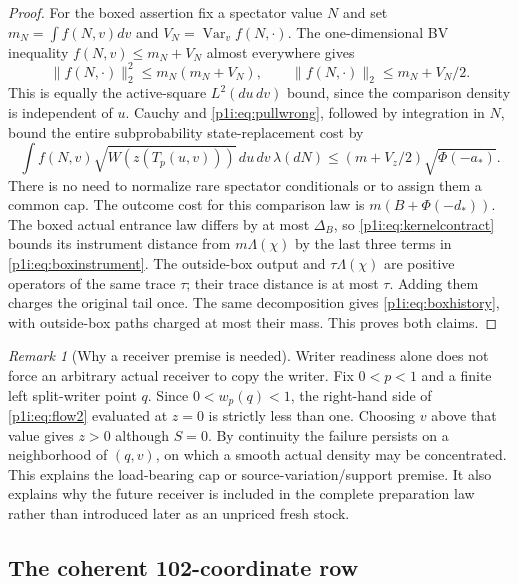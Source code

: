 \documentclass[11pt]{article}
\numberwithin{equation}{section}
\theoremstyle{definition}
\theoremstyle{remark}
\newtheorem{remark}[theorem]{Remark}
\begin{document}
\begin{proof}
For the boxed assertion fix a spectator value $N$ and set
$m_N=\int f(N,v)dv$ and $V_N=\operatorname{Var}_v f(N,\cdot)$.
The one-dimensional BV inequality $f(N,v)\leq m_N+V_N$ almost everywhere
gives
\[
 \|f(N,\cdot)\|_2^2\leq m_N(m_N+V_N),
 \qquad \|f(N,\cdot)\|_2\leq m_N+V_N/2.
\]
This is equally the active-square $L^2(du\,dv)$ bound, since the comparison
density is independent of $u$. Cauchy and \eqref{p1i:eq:pullwrong}, followed
by integration in $N$, bound the entire subprobability state-replacement
cost by
\begin{equation}\label{p1i:eq:BVstatefee}
 \int f(N,v)\sqrt{W(z(T_p(u,v)))}\,du\,dv\,\lambda(dN)
 \leq(m+V_z/2)\sqrt{\Phi(-a_*)}.
\end{equation}
There is no need to normalize rare spectator conditionals or to assign
them a common cap. The outcome cost for this comparison law is
$m(B+\Phi(-d_*))$. The boxed actual entrance law differs by at most
$\Delta_B$, so \eqref{p1i:eq:kernelcontract} bounds its instrument
distance from $m\Lambda(\chi)$ by the last three terms in
\eqref{p1i:eq:boxinstrument}. The outside-box output and
$\tau\Lambda(\chi)$ are positive operators of the same trace $\tau$;
their trace distance is at most $\tau$. Adding them charges the original
tail once. The same decomposition gives \eqref{p1i:eq:boxhistory}, with
outside-box paths charged at most their mass. This proves both claims.
\end{proof}

\begin{remark}[Why a receiver premise is needed]\label{p1i:rem:receiver}
Writer readiness alone does not force an arbitrary actual receiver to
copy the writer. Fix $0<p<1$ and a finite left split-writer point $q$.
Since $0<w_p(q)<1$, the right-hand side of \eqref{p1i:eq:flow2} evaluated
at $z=0$ is strictly less than one. Choosing $v$ above that value gives
$z>0$ although $S=0$. By continuity the failure persists on a neighborhood
of $(q,v)$, on which a smooth actual density may be concentrated. This
explains the load-bearing cap or source-variation/support premise.
It also explains why the future receiver is included in the complete
preparation law rather than introduced later as an unpriced fresh stock.
\end{remark}

\subsection{The coherent 102-coordinate row}
\end{document}

